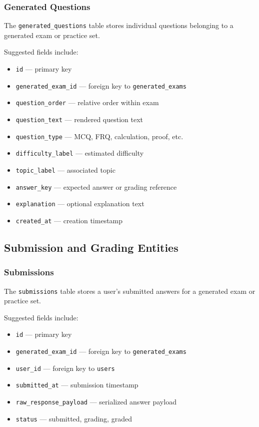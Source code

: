 \documentclass[11pt]{article}
\begin{document}
\subsubsection{Generated Questions}
The \texttt{generated\_questions} table stores individual questions belonging to a generated exam or practice set.

Suggested fields include:
\begin{itemize}
\item \texttt{id} --- primary key
\item \texttt{generated\_exam\_id} --- foreign key to \texttt{generated\_exams}
\item \texttt{question\_order} --- relative order within exam
\item \texttt{question\_text} --- rendered question text
\item \texttt{question\_type} --- MCQ, FRQ, calculation, proof, etc.
\item \texttt{difficulty\_label} --- estimated difficulty
\item \texttt{topic\_label} --- associated topic
\item \texttt{answer\_key} --- expected answer or grading reference
\item \texttt{explanation} --- optional explanation text
\item \texttt{created\_at} --- creation timestamp
\end{itemize}

\subsection{Submission and Grading Entities}

\subsubsection{Submissions}
The \texttt{submissions} table stores a user's submitted answers for a generated exam or practice set.

Suggested fields include:
\begin{itemize}
\item \texttt{id} --- primary key
\item \texttt{generated\_exam\_id} --- foreign key to \texttt{generated\_exams}
\item \texttt{user\_id} --- foreign key to \texttt{users}
\item \texttt{submitted\_at} --- submission timestamp
\item \texttt{raw\_response\_payload} --- serialized answer payload
\item \texttt{status} --- submitted, grading, graded
\end{itemize}
\end{document}
